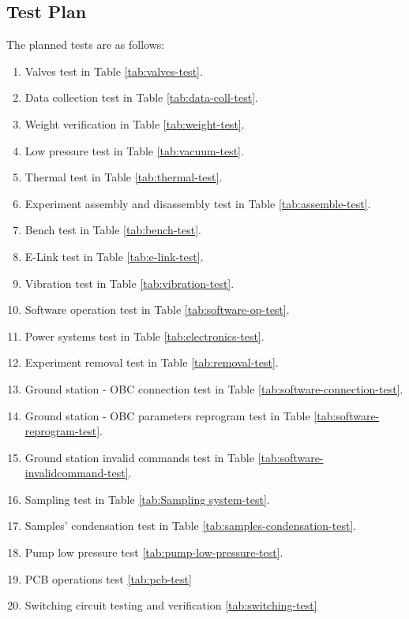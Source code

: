 \pagebreak
\subsection{Test Plan}

The planned tests are as follows:

\begin{enumerate}
    \item Valves test in Table \ref{tab:valves-test}.
    \item Data collection test in Table \ref{tab:data-coll-test}.
    \item Weight verification in Table \ref{tab:weight-test}.
    \item Low pressure test in Table \ref{tab:vacuum-test}.
    \item Thermal test in Table \ref{tab:thermal-test}.
    \item Experiment assembly and disassembly test in Table \ref{tab:assemble-test}.
    \item Bench test in Table \ref{tab:bench-test}.
    \item E-Link test in Table \ref{tab:e-link-test}.
    \item Vibration test in Table \ref{tab:vibration-test}.
    \item Software operation test in Table \ref{tab:software-op-test}.
    \item Power systems test in Table \ref{tab:electronics-test}.
    \item Experiment removal test in Table \ref{tab:removal-test}.
    \item Ground station - OBC connection test in Table \ref{tab:software-connection-test}.
    \item Ground station - OBC parameters reprogram test in Table \ref{tab:software-reprogram-test}.
    \item Ground station invalid commands test in Table \ref{tab:software-invalidcommand-test}.
    \item Sampling test in Table \ref{tab:Sampling system-test}.
    \item Samples' condensation test in Table \ref{tab:samples-condensation-test}.
    \item Pump low pressure test \ref{tab:pump-low-pressure-test}.
    \item PCB operations test \ref{tab:pcb-test}
    \item Switching circuit testing and verification \ref{tab:switching-test}
\end{enumerate}

